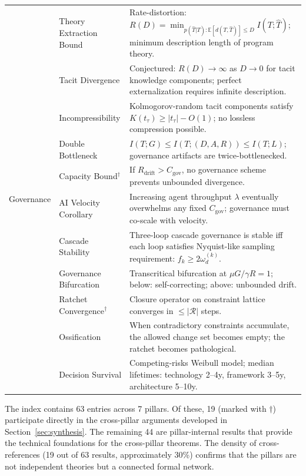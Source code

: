 \begin{appendices}
\begin{table}[H]
\begin{tabular}{p{1.8cm}p{3.8cm}p{7.5cm}}
\multirow{11}{1.8cm}{Governance}
    & Theory Extraction Bound & Rate-distortion: $R(D) = \min_{p(\hat{T}|T): \mathbb{E}[d(T,\hat{T})] \leq D} I(T;\hat{T})$; minimum description length of program theory. \\
    & Tacit Divergence & Conjectured: $R(D) \to \infty$ as $D \to 0$ for tacit knowledge components; perfect externalization requires infinite description. \\
    & Incompressibility & Kolmogorov-random tacit components satisfy $K(t_\tau) \geq |t_\tau| - O(1)$; no lossless compression possible. \\
    & Double Bottleneck & $I(T;G) \leq I(T;(D,A,R)) \leq I(T;L)$; governance artifacts are twice-bottlenecked. \\
    & Capacity Bound$^\dagger$ & If $R_{\text{drift}} > C_{\text{gov}}$, no governance scheme prevents unbounded divergence. \\
    & AI Velocity Corollary & Increasing agent throughput $\lambda$ eventually overwhelms any fixed $C_{\text{gov}}$; governance must co-scale with velocity. \\
    & Cascade Stability & Three-loop cascade governance is stable iff each loop satisfies Nyquist-like sampling requirement: $f_k \geq 2\omega_d^{(k)}$. \\
    & Governance Bifurcation & Transcritical bifurcation at $\mu G / \gamma R = 1$; below: self-correcting; above: unbounded drift. \\
    & Ratchet Convergence$^\dagger$ & Closure operator on constraint lattice converges in $\leq |\mathcal{R}|$ steps. \\
    & Ossification & When contradictory constraints accumulate, the allowed change set becomes empty; the ratchet becomes pathological. \\
    & Decision Survival & Competing-risks Weibull model; median lifetimes: technology 2--4y, framework 3--5y, architecture 5--10y. \\

\bottomrule
\end{tabular}
\end{table}

The index contains 63 entries across 7 pillars. Of these, 19 (marked with $\dagger$) participate directly in the cross-pillar arguments developed in Section~\ref{sec:synthesis}. The remaining 44 are pillar-internal results that provide the technical foundations for the cross-pillar theorems. The density of cross-references (19 out of 63 results, approximately 30\%) confirms that the pillars are not independent theories but a connected formal network.

\end{appendices}
